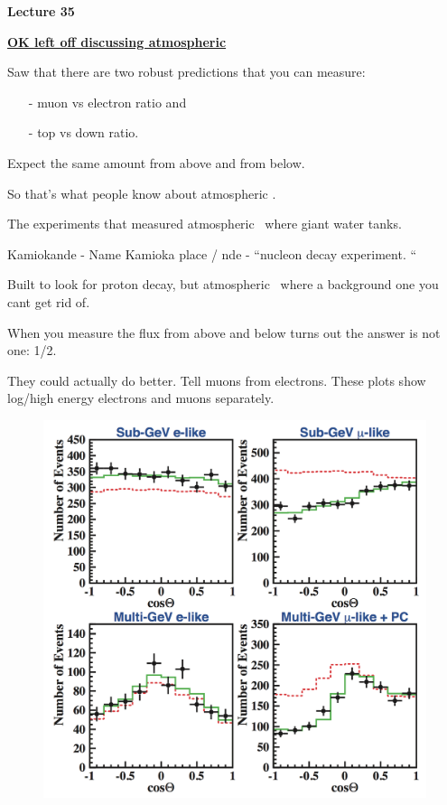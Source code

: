 



\thispagestyle{fancy}

\begin{center}
{\huge \textbf{Lecture 35}}
\end{center}

{\fontsize{14}{16}\selectfont

\textbf{\underline{OK left off discussing atmospheric \nus}} 

Saw that there are two robust predictions that you can measure:
\begin{itemize}
\item[-]muon vs electron ratio and
\item[-]top vs down ratio. 
\end{itemize}

Expect the same amount from above and from below.

So that's what people know about atmospheric \nus. 

The experiments that measured atmospheric \nus\ where giant water tanks.

Kamiokande - Name Kamioka place / nde - ``nucleon decay experiment. ``

Built to look for proton decay, but atmospheric \nus\ where a background one you cant get rid of. 

When you measure the flux from above and below turns out the answer is not one: 1/2.

They could actually do better. 
Tell muons from electrons.
These plots show log/high energy electrons and muons separately. 
\clearpage

\begin{figure}[h!]
\centering
\includegraphics[width=1.0\textwidth]{./sk.png}
\end{figure}
\clearpage

}
